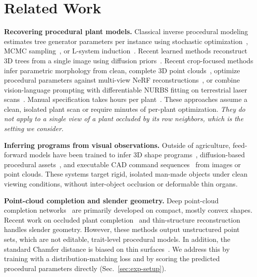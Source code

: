 \documentclass[10pt,twocolumn,letterpaper]{article}
\begin{document}
\section{Related Work}
\label{sec:related}

\noindent\textbf{Recovering procedural plant models.}
Classical inverse procedural modeling estimates tree generator parameters per instance using stochastic optimization~\citep{stava2014ipmtrees}, MCMC sampling~\citep{talton2011metropolis}, or L-system induction~\citep{guo2020ipmlsys,latentlsys2023}. Recent learned methods reconstruct 3D trees from a single image using diffusion priors~\citep{svdtree2024,lee2024treedfusion}. Recent crop-focused methods infer parametric morphology from clean, complete 3D point clouds~\citep{demeter2025,ghrer2025paramplants}, optimize procedural parameters against multi-view NeRF reconstructions~\citep{cropcraft2026}, or combine vision-language prompting with differentiable NURBS fitting on terrestrial laser scans~\citep{hadadi2026vlmmaize,nurbsdiff2022}. Manual specification takes hours per plant~\citep{floraforge2026}. These approaches assume a clean, isolated plant scan or require minutes of per-plant optimization. \textit{They do not apply to a single view of a plant occluded by its row neighbors, which is the setting we consider.}


\noindent\textbf{Inferring programs from visual observations.}
Outside of agriculture, feed-forward models have been trained to infer 3D shape programs~\citep{shapeprograms2019}, diffusion-based procedural assets~\citep{zhao2025dipcg}, and executable CAD command sequences~\citep{text2cad2024,kolodiazhnyi2025cadrille} from images or point clouds. These systems target rigid, isolated man-made objects under clean viewing conditions, without inter-object occlusion or deformable thin organs.

\noindent\textbf{Point-cloud completion and slender geometry.}
Deep point-cloud completion networks~\citep{yuan2018pcn,yu2021pointr,yu2023adapointr,cai2024einet} are primarily developed on compact, mostly convex shapes. Recent work on occluded plant completion~\citep{lee2026occ} and thin-structure reconstruction~\citep{curvegaussian2025,qi2026rethinking} handles slender geometry. However, these methods output unstructured point sets, which are not editable, trait-level procedural models. In addition, the standard Chamfer distance is biased on thin surfaces~\citep{wu2021dcd,song2026structural,lin2023infocd}. We address this by training with a distribution-matching loss and by scoring the predicted procedural parameters directly (Sec.~\ref{sec:exp-setup}).
\end{document}
